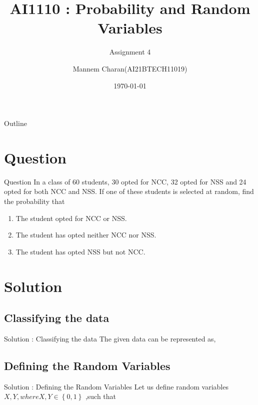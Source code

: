 \documentclass{beamer}
\title{AI1110 : Probability and Random Variables}
\subtitle{Assignment 4}
\author{Mannem Charan(AI21BTECH11019)}
\date{\today}
\providecommand{\cbrak}[1]{\ensuremath{\left\{#1\right\}}}
\begin{document}
\begin{frame}
    \titlepage 
\end{frame}


\begin{frame}{Outline}
    \tableofcontents
\end{frame}


\section{Question}
\begin{frame}{Question}
 In a class of 60 students, 30 opted for NCC, 32 opted for NSS and 24 opted for both NCC and NSS. If one of these students is selected at random, find the probability that
\begin{enumerate}[label = (\alph{enumi})]
    \item The student opted for NCC or NSS.
    \item The student has opted neither NCC nor NSS.
    \item The student has opted NSS but not NCC.
\end{enumerate}
\end{frame}


\section{Solution}
\subsection{Classifying the data}
\begin{frame}{Solution : Classifying the data}
        The given data can be represented as,
	        \begin{table}[ht!]
        
        \caption{}
        \label{table:table 1}
       \end{table}
  \end{frame}
\subsection{Defining the Random Variables}
\begin{frame}{ Solution : Defining the Random Variables}
  Let us define random variables $X,Y, where X,Y \in  \cbrak{0,1}$ ,such that
        \begin{table}[ht!]
        
        \caption{}
        \label{table:table 2}
       \end{table}
 \end{frame}
   
\end{document}
